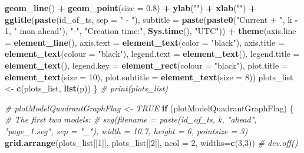 \documentclass[
]{article}
\newenvironment{Shaded}{\begin{snugshade}}{\end{snugshade}}
\newcommand{\AttributeTok}[1]{\textcolor[rgb]{0.13,0.29,0.53}{#1}}
\newcommand{\CommentTok}[1]{\textcolor[rgb]{0.56,0.35,0.01}{\textit{#1}}}
\newcommand{\ControlFlowTok}[1]{\textcolor[rgb]{0.13,0.29,0.53}{\textbf{#1}}}
\newcommand{\DecValTok}[1]{\textcolor[rgb]{0.00,0.00,0.81}{#1}}
\newcommand{\FloatTok}[1]{\textcolor[rgb]{0.00,0.00,0.81}{#1}}
\newcommand{\FunctionTok}[1]{\textcolor[rgb]{0.13,0.29,0.53}{\textbf{#1}}}
\newcommand{\NormalTok}[1]{#1}
\newcommand{\OtherTok}[1]{\textcolor[rgb]{0.56,0.35,0.01}{#1}}
\newcommand{\SpecialCharTok}[1]{\textcolor[rgb]{0.81,0.36,0.00}{\textbf{#1}}}
\newcommand{\StringTok}[1]{\textcolor[rgb]{0.31,0.60,0.02}{#1}}
\begin{document}
\begin{Shaded}
\begin{Highlighting}[]
        \FunctionTok{geom\_line}\NormalTok{() }\SpecialCharTok{+}
        \FunctionTok{geom\_point}\NormalTok{(}\AttributeTok{size =} \FloatTok{0.8}\NormalTok{) }\SpecialCharTok{+}
        \FunctionTok{ylab}\NormalTok{(}\StringTok{""}\NormalTok{) }\SpecialCharTok{+}
        \FunctionTok{xlab}\NormalTok{(}\StringTok{""}\NormalTok{) }\SpecialCharTok{+}
        \FunctionTok{ggtitle}\NormalTok{(}\FunctionTok{paste}\NormalTok{(id\_of\_ts, }\AttributeTok{sep =} \StringTok{" {-} "}\NormalTok{), }\AttributeTok{subtitle =} \FunctionTok{paste}\NormalTok{(}\FunctionTok{paste0}\NormalTok{(}\StringTok{"Current + "}\NormalTok{, k }\SpecialCharTok{{-}} \DecValTok{1}\NormalTok{, }\StringTok{" mon ahead"}\NormalTok{), }\StringTok{"{-}"}\NormalTok{, }\StringTok{"Creation time:"}\NormalTok{, }\FunctionTok{Sys.time}\NormalTok{(), }\StringTok{"UTC"}\NormalTok{)) }\SpecialCharTok{+}
        \FunctionTok{theme}\NormalTok{(}\AttributeTok{axis.line =} \FunctionTok{element\_line}\NormalTok{(), }\AttributeTok{axis.text =} \FunctionTok{element\_text}\NormalTok{(}\AttributeTok{color =} \StringTok{"black"}\NormalTok{), }\AttributeTok{axis.title =} \FunctionTok{element\_text}\NormalTok{(}\AttributeTok{colour =} \StringTok{"black"}\NormalTok{), }\AttributeTok{legend.text =} \FunctionTok{element\_text}\NormalTok{(), }\AttributeTok{legend.title =} \FunctionTok{element\_text}\NormalTok{(), }\AttributeTok{legend.key =} \FunctionTok{element\_rect}\NormalTok{(}\AttributeTok{colour =} \StringTok{"black"}\NormalTok{), }\AttributeTok{plot.title =} \FunctionTok{element\_text}\NormalTok{(}\AttributeTok{size =} \DecValTok{10}\NormalTok{), }\AttributeTok{plot.subtitle =} \FunctionTok{element\_text}\NormalTok{(}\AttributeTok{size =} \DecValTok{8}\NormalTok{))}
\NormalTok{      plots\_list }\OtherTok{\textless{}{-}} \FunctionTok{c}\NormalTok{(plots\_list, }\FunctionTok{list}\NormalTok{(p))}
\NormalTok{    \}}
    \CommentTok{\# print(plots\_list)}

    \CommentTok{\# plotModelQuadrantGraphFlag \textless{}{-} TRUE}
    \ControlFlowTok{if}\NormalTok{ (plotModelQuadrantGraphFlag) \{}
      \CommentTok{\# The first two models:}
      \CommentTok{\# svg(filename = paste(id\_of\_ts, k, "ahead", "page\_1.svg", sep = "\_"), width = 10.7, height = 6, pointsize = 3)}
      \FunctionTok{grid.arrange}\NormalTok{(plots\_list[[}\DecValTok{1}\NormalTok{]], plots\_list[[}\DecValTok{2}\NormalTok{]], }\AttributeTok{ncol =} \DecValTok{2}\NormalTok{, }\AttributeTok{widths=}\FunctionTok{c}\NormalTok{(}\DecValTok{3}\NormalTok{,}\DecValTok{3}\NormalTok{))}
      \CommentTok{\# dev.off()}


\end{Highlighting}
\end{Shaded}
\end{document}
